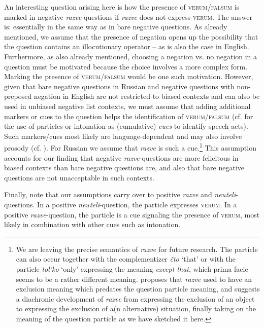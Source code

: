 \documentclass[output=paper,colorlinks,citecolor=brown]{langscibook}
\begin{document}
An interesting question arising here is how the presence of \textsc{verum}/\textsc{falsum} is marked in negative \textit{razve}-questions if \textit{razve} does not express \textsc{verum}. The answer is: essentially in the same way as in bare negative questions. As already mentioned, we assume that the presence of negation opens up the possibility that the question contains an illocutionary operator – as is also the case in English. Furthermore, as also already mentioned, choosing a negation vs. no negation in a question must be motivated because the choice involves a more complex form. Marking the presence of \textsc{verum}/\textsc{falsum} would be one such motivation. However, given that bare negative questions in Russian and negative questions with non-preposed negation in English are not restricted to biased contexts and can also be used in unbiased negative list contexts, we must assume that adding additional markers or cues to the question helps the identification of \textsc{verum}/\textsc{falsum} (cf. \citealt{grosz12} for the use of particles or intonation as (cumulative) \textit{cues} to identify speech acts). Such markers/cues most likely are language-dependent and may also involve prosody (cf. \citealt{arnhold2021}). For Russian we assume that \textit{razve} is such a cue.\footnote[9]{We are leaving the precise semantics of \textit{razve} for future research. The particle can also occur together with the complementizer \textit{čto} `that' or with the particle \textit{tol'ko} `only' expressing the meaning \textit{except that}, which prima facie seems to be a rather different meaning. \citet{zalizniak20} proposes that \textit{razve} used to have an exclusion meaning which predates the question particle meaning, and suggests a diachronic development of \textit{razve} from expressing the exclusion of an object to expressing the exclusion of a(n alternative) situation, finally taking on the meaning of the question particle as we have sketched it here.} This assumption accounts for our finding that negative \textit{razve}-questions are more felicitous in biased contexts than bare negative questions are, and also that bare negative questions are not unacceptable in such contexts. 

Finally, note that our assumptions carry over to positive \textit{razve} and \textit{neuželi}-questions. In a positive \textit{neuželi}-question, the particle expresses \textsc{verum}. In a positive \textit{razve}-question, the particle is a cue signaling the presence of \textsc{verum}, most likely in combination with other cues such as intonation.  
\end{document}
